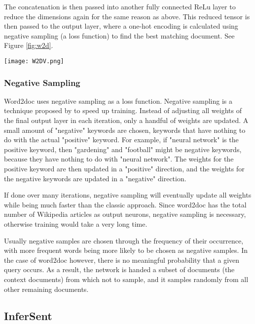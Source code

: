 The concatenation is then passed into another fully connected ReLu layer to reduce the dimensions again for the same reason as
above. This reduced tensor is then passed to the output layer, where a one-hot encoding is calculated using negative sampling (a
loss function) to find the best matching document. See Figure \ref{fig:w2d}.

\begin{sidewaysfigure}
  \begin{center}
    \texttt{[image: W2DV.png]}
  \end{center}
  \caption{W2D Architecture}
  \label{fig:w2d}
\end{sidewaysfigure}


\subsubsection{Negative Sampling}
\label{theory:negsamp}
Word2doc uses negative sampling as a loss function. Negative sampling is a technique proposed by \citet{neg-sample} to speed up
training. Instead of adjusting all weights of the final output layer in each iteration, only a handful of weights are updated.
A small amount of "negative" keywords are chosen, keywords that have nothing to do with the actual "positive" keyword.
For example, if "neural network" is the positive keyword, then "gardening" and "football" might be negative keywords, because
they have nothing to do with "neural network". The weights for the positive keyword are then updated in a "positive" direction,
and the weights for the negative keywords are updated in a "negative" direction.

If done over many iterations, negative sampling will eventually update all weights while being much faster than the
classic approach. Since word2doc has the total number of Wikipedia articles as output neurons, negative sampling is necessary,
otherwise training would take a very long time.

Usually negative samples are chosen through the frequency of their occurrence, with more frequent words being more likely to be
chosen as negative samples. In the case of word2doc however, there is no meaningful probability that a given query occurs.
As a result, the network is handed a subset of documents (the context documents) from which not to sample, and it samples
randomly from all other remaining documents.

\subsection{InferSent}
\label{theory:inf}

